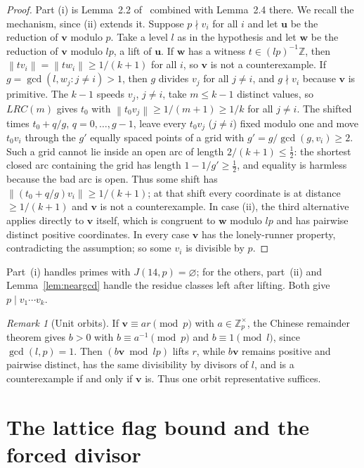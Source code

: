 \documentclass[11pt]{article}
\theoremstyle{definition}
\theoremstyle{remark}
\newtheorem{remark}[theorem]{Remark}
\newcommand{\Z}{\mathbb{Z}}
\newcommand{\vct}[1]{\mathbf{#1}}
\newcommand{\nearest}[1]{\left\lVert #1\right\rVert}
\begin{document}
\begin{proof}
Part (i) is Lemma~2.2 of~\cite{ST26} combined with Lemma~2.4 there.  We
recall the mechanism, since (ii) extends it.  Suppose $p\nmid v_i$ for all
$i$ and let $\vct{u}$ be the reduction of $\vct{v}$ modulo $p$.  Take a
level $l$ as in the hypothesis and let $\vct{w}$ be the reduction of
$\vct{v}$ modulo $lp$, a lift of $\vct{u}$.  If $\vct{w}$ has a witness
$t\in(lp)^{-1}\Z$, then $\nearest{tv_i}=\nearest{tw_i}\geq1/(k+1)$ for
all $i$, so $\vct{v}$ is not a counterexample.  If
$g=\gcd(l,w_j:j\neq i)>1$, then $g$ divides $v_j$ for all $j\neq i$, and
$g\nmid v_i$ because $\vct{v}$ is primitive.  The $k-1$ speeds $v_j$,
$j\neq i$, take $m\leq k-1$ distinct values, so $LRC(m)$ gives $t_0$ with
$\nearest{t_0v_j}\geq1/(m+1)\geq1/k$ for all $j\neq i$.  The shifted
times $t_0+q/g$, $q=0,\ldots,g-1$, leave every $t_0v_j$ ($j\neq i$) fixed
modulo one and move $t_0v_i$ through the $g'$ equally spaced points of a
grid with $g'=g/\gcd(g,v_i)\geq2$.  Such a grid cannot lie inside an open
arc of length $2/(k+1)\leq\frac12$: the shortest closed arc containing the
grid has length $1-1/g'\geq\frac12$, and equality is harmless because the
bad arc is open.  Thus some shift has
$\nearest{(t_0+q/g)v_i}\geq1/(k+1)$; at that shift every coordinate is at
distance $\geq1/(k+1)$ and $\vct{v}$ is not a counterexample.  In case
(ii), the third alternative applies directly to
$\vct{v}$ itself, which is congruent to $\vct{w}$ modulo $lp$ and has
pairwise distinct positive coordinates.  In every case $\vct{v}$ has the
lonely-runner property, contradicting the assumption; so some $v_i$ is
divisible by $p$.
\end{proof}

Part~(i) handles primes with $J(14,p)=\varnothing$; for the others,
part~(ii) and Lemma~\ref{lem:neargcd} handle the residue classes left after
lifting.  Both give $p\mid v_1\cdots v_k$.

\begin{remark}[Unit orbits]
If $\vct{v}\equiv a r\pmod p$ with $a\in\Z_p^\times$, the Chinese
remainder theorem gives $b>0$ with $b\equiv a^{-1}\pmod p$ and
$b\equiv1\pmod l$, since $\gcd(l,p)=1$.  Then $(b\vct{v}\bmod lp)$ lifts
$r$, while $b\vct{v}$ remains positive and pairwise distinct, has the same
divisibility by divisors of $l$, and is a counterexample if and only if
$\vct{v}$ is.  Thus one orbit representative suffices.
\end{remark}

\section{The lattice flag bound and the forced divisor}\label{sec:flag}
\end{document}
